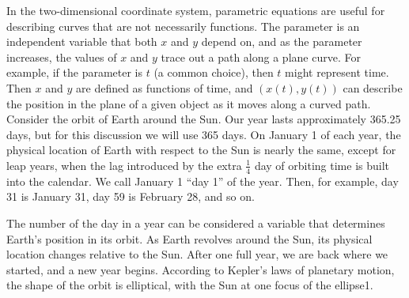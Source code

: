 \documentclass{report}
\begin{document}
    \bigbreak \noindent 
    \bigbreak \noindent 
    In the two-dimensional coordinate system, parametric equations are useful for describing curves that are not necessarily functions. The parameter is an independent variable that both \( x \) and \( y \) depend on, and as the parameter increases, the values of \( x \) and \( y \) trace out a path along a plane curve. For example, if the parameter is \( t \) (a common choice), then \( t \) might represent time. Then \( x \) and \( y \) are defined as functions of time, and \( (x(t), y(t)) \) can describe the position in the plane of a given object as it moves along a curved path.
    \bigbreak \noindent 
    Consider the orbit of Earth around the Sun. Our year lasts approximately 365.25 days, but for this discussion we will use 365 days. On January 1 of each year, the physical location of Earth with respect to the Sun is nearly the same, except for leap years, when the lag introduced by the extra \( \frac{1}{4} \) day of orbiting time is built into the calendar. We call January 1 ``day 1'' of the year. Then, for example, day 31 is January 31, day 59 is February 28, and so on.
    \bigbreak \noindent 
    \begin{minipage}[b]{0.47\textwidth}
        The number of the day in a year can be considered a variable that determines Earth’s position in its orbit. As Earth revolves around the Sun, its physical location changes relative to the Sun. After one full year, we are back where we started, and a new year begins. According to Kepler’s laws of planetary motion, the shape of the orbit is elliptical, with the Sun at one focus of the ellipse1. 
    \end{minipage}
    \hspace{.1in} 
    \begin{minipage}[t]{0.47\textwidth}
    \end{minipage}
\end{document}
